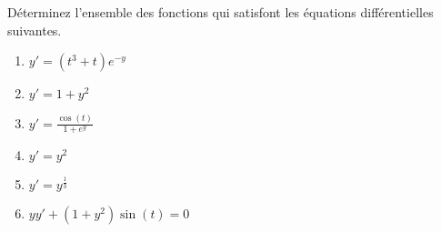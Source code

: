 
\begin{exercice}\label{exoEqsDiff0002}

Déterminez l'ensemble des fonctions qui satisfont les équations différentielles suivantes.
\begin{multicols}{2}
\begin{enumerate}
	\item\label{ItemaEqsDiff00002} $ y' = (t^3 + t) e^{-y} $
	\item $ y' = 1 + y^2 $
	\item $ y' = \frac{\cos(t)}{1 + e^y} $
	\item $ y' = y^2 \label{zero} $
	\item $ y' = y^{\frac{1}{3}} \label{unique} $
	\item\label{ItemfEqsDiff00002} $ yy' + (1 + y^2) \sin(t) = 0 \label{crasse} $
\end{enumerate}	
\end{multicols}

\end{exercice}
